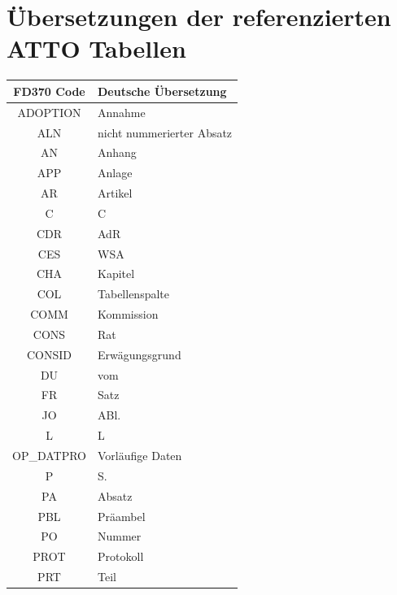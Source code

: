 
    \pagebreak
    \section{Übersetzungen der referenzierten ATTO Tabellen}
    
    \begin{table}[H]
        \centering
        \begin{tabular}{|c|l|}\hline
            FD370 Code & Deutsche Übersetzung \\\hline \hline
            ADOPTION & Annahme \\\hline
            ALN & nicht nummerierter Absatz \\\hline
            AN & Anhang \\\hline
            APP & Anlage \\\hline
            AR & Artikel \\\hline
            C & C \\\hline
            CDR & AdR \\\hline
            CES & WSA \\\hline
            CHA & Kapitel \\\hline
            COL & Tabellenspalte \\\hline
            COMM & Kommission \\\hline
            CONS & Rat \\\hline
            CONSID & Erwägungsgrund \\\hline
            DU & vom \\\hline
            FR & Satz \\\hline
            JO & ABl. \\\hline
            L & L \\\hline
            OP\_DATPRO & Vorläufige Daten \\\hline
            P & S. \\\hline
            PA & Absatz \\\hline
            PBL & Präambel \\\hline
            PO & Nummer \\\hline
            PROT & Protokoll \\\hline
            PRT & Teil \\\hline

\end{tabular}
\end{table}
